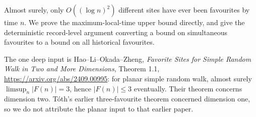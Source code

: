 Almost surely, only $O((\log n)^2)$ different sites have ever been favourites by time $n$. We prove the maximum-local-time upper bound directly, and give the deterministic record-level argument converting a bound on simultaneous favourites to a bound on all historical favourites.

The one deep input is Hao--Li--Okada--Zheng, \emph{Favorite Sites for Simple Random Walk in Two and More Dimensions}, Theorem 1.1, \url{https://arxiv.org/abs/2409.00995}: for planar simple random walk, almost surely $\limsup_n|F(n)|=3$, hence $|F(n)|\le3$ eventually. Their theorem concerns dimension two. T\'oth's earlier three-favourite theorem concerned dimension one, so we do not attribute the planar input to that earlier paper.
